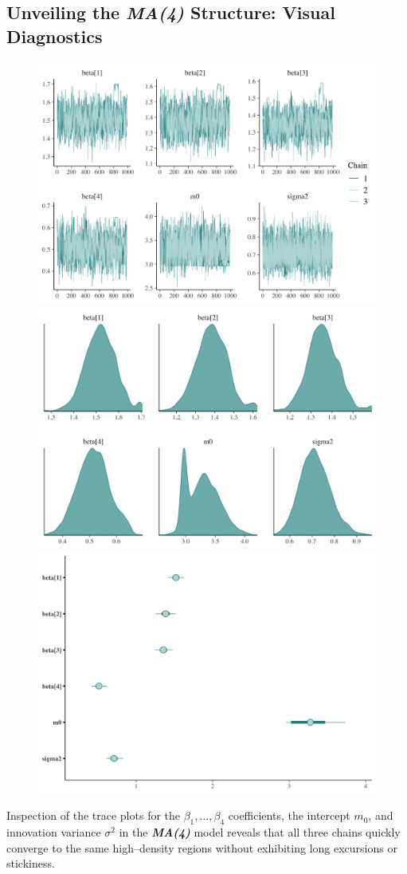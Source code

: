 \documentclass{Configuration_Files/PoliMi3i_thesis}
\begin{document}
\subsection{Unveiling the \textbf{\textit{MA(4)}} Structure: Visual Diagnostics}
\begin{figure}[H]
    \centering
    \includegraphics[width=0.62\linewidth]{MA(4)-trace.png}
    \vspace{0.5em}
    
    \includegraphics[width=0.62\linewidth]{MA(4)-density.png}
    \vspace{0.5em}
    
    \includegraphics[width=0.62\linewidth]{MA(4)-interval.png}
\end{figure}

Inspection of the trace plots for the \(\beta_1,\dots,\beta_4\) coefficients, the intercept \(m_0\), and innovation variance \(\sigma^2\) in the \textbf{\textit{MA(4)}} model reveals that all three chains quickly converge to the same high–density regions without exhibiting long excursions or stickiness.  
\end{document}
